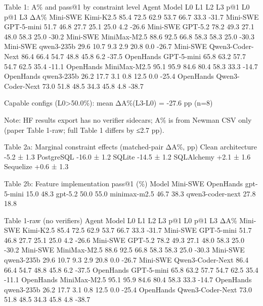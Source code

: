 Table 1: A\% and pass@1 by constraint level
Agent        Model                      L0     L1     L2     L3   p@1 L0  p@1 L3     ΔA\%
Mini-SWE     Kimi-K2.5                85.4   72.5   62.9   53.7     66.7    33.3   -31.7
Mini-SWE     GPT-5-mini               51.7   46.8   27.7   25.1     25.0     4.2   -26.6
Mini-SWE     GPT-5.2                  78.2   49.3   27.1   48.0     58.3    25.0   -30.2
Mini-SWE     MiniMax-M2.5             88.6   92.5   66.8   58.3     58.3    25.0   -30.3
Mini-SWE     qwen3-235b               29.6   10.7    9.3    2.9     20.8     0.0   -26.7
Mini-SWE     Qwen3-Coder-Next         86.4   66.4   54.7   48.8     45.8     6.2   -37.5
OpenHands    GPT-5-mini               65.8   63.2   57.7   54.7     62.5    35.4   -11.1
OpenHands    MiniMax-M2.5             95.1   95.9   84.6   80.4     58.3    33.3   -14.7
OpenHands    qwen3-235b               26.2   17.7    3.1    0.8     12.5     0.0   -25.4
OpenHands    Qwen3-Coder-Next         73.0   51.8   48.5   34.3     45.8     4.8   -38.7

Capable configs (L0>50.0\%): mean ΔA\%(L3-L0) = -27.6 pp (n=8)

Note: HF results export has no verifier sidecars; A\% is from Newman CSV only (paper Table 1-raw; full Table 1 differs by ≤2.7 pp).

Table 2a: Marginal constraint effects (matched-pair ΔA\%, pp)
  Clean architecture     -5.2 ± 1.3
  PostgreSQL             -16.0 ± 1.2
  SQLite                 -14.5 ± 1.2
  SQLAlchemy             +2.1 ± 1.6
  Sequelize              +0.6 ± 1.3

Table 2b: Feature implementation pass@1 (\%)
Model                    Mini-SWE  OpenHands
gpt-5-mini                   15.0       48.3
gpt-5.2                      50.0       55.0
minimax-m2.5                 46.7       38.3
qwen3-coder-next             27.8       18.8

Table 1-raw (no verifiers)
Agent        Model                      L0     L1     L2     L3   p@1 L0  p@1 L3     ΔA\%
Mini-SWE     Kimi-K2.5                85.4   72.5   62.9   53.7     66.7    33.3   -31.7
Mini-SWE     GPT-5-mini               51.7   46.8   27.7   25.1     25.0     4.2   -26.6
Mini-SWE     GPT-5.2                  78.2   49.3   27.1   48.0     58.3    25.0   -30.2
Mini-SWE     MiniMax-M2.5             88.6   92.5   66.8   58.3     58.3    25.0   -30.3
Mini-SWE     qwen3-235b               29.6   10.7    9.3    2.9     20.8     0.0   -26.7
Mini-SWE     Qwen3-Coder-Next         86.4   66.4   54.7   48.8     45.8     6.2   -37.5
OpenHands    GPT-5-mini               65.8   63.2   57.7   54.7     62.5    35.4   -11.1
OpenHands    MiniMax-M2.5             95.1   95.9   84.6   80.4     58.3    33.3   -14.7
OpenHands    qwen3-235b               26.2   17.7    3.1    0.8     12.5     0.0   -25.4
OpenHands    Qwen3-Coder-Next         73.0   51.8   48.5   34.3     45.8     4.8   -38.7

